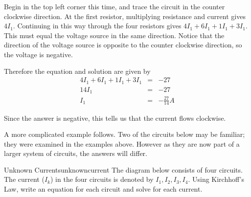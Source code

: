 \begin{solution}
Begin in the top left corner this time, and trace the circuit in the counter clockwise direction. At the first resistor, multiplying resistance and current gives $4I_1$. Continuing in this way through the four resistors gives $4I_1 + 6I_1 + 1 I_1 + 3I_1$. This must equal the voltage source in the same direction. Notice that the direction of the voltage source is opposite to the counter clockwise direction, so the voltage is negative. 

Therefore the equation and solution are given by
\begin{eqnarray*}
4I_1 + 6I_1 + 1 I_1 + 3I_1&=& -27 \\
14I_1 &=& -27 \\
I_1 &=& -\frac{27}{14} A
\end{eqnarray*}

Since the answer is negative, this tells us that the current flows clockwise. 
\end{solution}

A more complicated example follows. Two of the circuits below may be familiar; they were examined in the examples above. However as they are now part of a larger system of circuits, the answers will differ. 

\begin{example}{Unknown Currents}{unknowncurrent}
The diagram below consists of four circuits. The current ($I_k$) in the four circuits is denoted by $I_{1},I_{2},I_{3},I_{4}$. Using Kirchhoff's Law, write an equation for each circuit and solve for each current.
\end{example}

